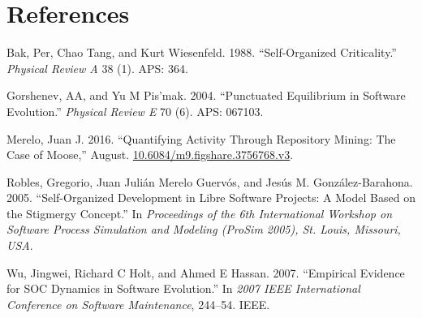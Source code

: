 \documentclass[]{article}
\begin{document}
\section*{References}\label{references}

\hypertarget{refs}{}
\hypertarget{ref-bak1988self}{}
Bak, Per, Chao Tang, and Kurt Wiesenfeld. 1988. ``Self-Organized
Criticality.'' \emph{Physical Review A} 38 (1). APS: 364.

\hypertarget{ref-gorshenev2004punctuated}{}
Gorshenev, AA, and Yu M Pis'mak. 2004. ``Punctuated Equilibrium in
Software Evolution.'' \emph{Physical Review E} 70 (6). APS: 067103.

\hypertarget{ref-Merelo2016}{}
Merelo, Juan J. 2016. ``Quantifying Activity Through Repository Mining:
The Case of Moose,'' August. \url{10.6084/m9.figshare.3756768.v3}.

\hypertarget{ref-robles05}{}
Robles, Gregorio, Juan Julián Merelo Guervós, and Jesús M.
González-Barahona. 2005. ``Self-Organized Development in Libre Software
Projects: A Model Based on the Stigmergy Concept.'' In \emph{Proceedings
of the 6th International Workshop on Software Process Simulation and
Modeling (ProSim 2005), St. Louis, Missouri, USA}.

\hypertarget{ref-wu2007empirical}{}
Wu, Jingwei, Richard C Holt, and Ahmed E Hassan. 2007. ``Empirical
Evidence for SOC Dynamics in Software Evolution.'' In \emph{2007 IEEE
International Conference on Software Maintenance}, 244--54. IEEE.
\end{document}
